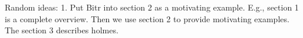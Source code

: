 Random ideas:
1. Put Bitr into section 2 as a motivating example.  E.g., section 1
is a complete overview. Then we use section 2 to provide motivating
examples. The section 3 describes holmes.


%




